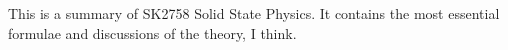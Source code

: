 This is a summary of SK2758 Solid State Physics. It contains the most essential formulae and discussions of the theory, I think.